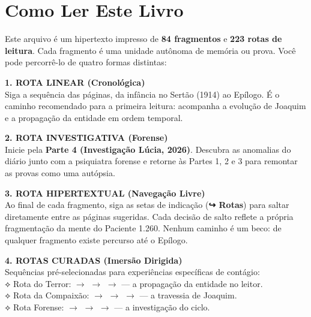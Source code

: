 \cleardoublepage
\thispagestyle{empty}
\chapter*{Como Ler Este Livro}

\begingroup

Este arquivo é um hipertexto impresso de \textbf{84 fragmentos} e \textbf{223 rotas de leitura}. Cada fragmento é uma unidade autônoma de memória ou prova. Você pode percorrê-lo de quatro formas distintas:

\vspace{0.8em}

\noindent\textbf{1. ROTA LINEAR (Cronológica)}\\
\noindent Siga a sequência das páginas, da infância no Sertão (1914) ao Epílogo. É o caminho recomendado para a primeira leitura: acompanha a evolução de Joaquim e a propagação da entidade em ordem temporal.

\vspace{0.5em}

\noindent\textbf{2. ROTA INVESTIGATIVA (Forense)}\\
\noindent Inicie pela \textbf{Parte 4 (Investigação Lúcia, 2026)}. Descubra as anomalias do diário junto com a psiquiatra forense e retorne às Partes 1, 2 e 3 para remontar as provas como uma autópsia.

\vspace{0.5em}

\noindent\textbf{3. ROTA HIPERTEXTUAL (Navegação Livre)}\\
\noindent Ao final de cada fragmento, siga as setas de indicação (\textbf{↪ Rotas}) para saltar diretamente entre as páginas sugeridas. Cada decisão de salto reflete a própria fragmentação da mente do Paciente 1.260. Nenhum caminho é um beco: de qualquer fragmento existe percurso até o Epílogo.

\vspace{0.5em}

\noindent\textbf{4. ROTAS CURADAS (Imersão Dirigida)}\\
\noindent Sequências pré-selecionadas para experiências específicas de contágio:\\[0.3em]
\noindent\textcolor{sangue}{⟡ Rota do Terror:}  $\rightarrow$  $\rightarrow$  $\rightarrow$  --- a propagação da entidade no leitor.\\[0.2em]
\noindent\textcolor{sangue}{⟡ Rota da Compaixão:}  $\rightarrow$  $\rightarrow$  $\rightarrow$  --- a travessia de Joaquim.\\[0.2em]
\noindent\textcolor{sangue}{⟡ Rota Forense:}  $\rightarrow$  $\rightarrow$  $\rightarrow$  --- a investigação do ciclo.

